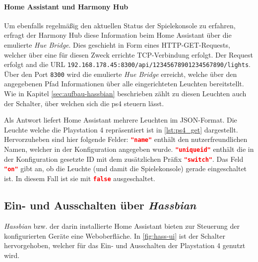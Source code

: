 






\paragraph{Home Assistant und Harmony Hub}
Um ebenfalls regelmäßig den aktuellen Status der Spielekonsole zu erfahren,
erfragt der Harmony Hub diese Information beim Home Assistant über die emulierte \textit{Hue Bridge}.
Dies geschieht in Form eines HTTP-GET-Requests,
welcher über eine für diesen Zweck errichte TCP-Verbindung erfolgt.
Der Request erfolgt and die URL \nolinkurl{192.168.178.45:8300/api/12345678901234567890/lights}.
Über den Port \texttt{8300} wird die emulierte \textit{Hue Bridge} erreicht,
welche über den angegebenen Pfad Informationen über alle eingerichteten Leuchten bereitstellt.
Wie in Kapitel \ref{sec:aufbau-hassbian} \textit{} beschrieben zählt zu diesen Leuchten
auch der Schalter, über welchen sich die \ac{ps4} steuern lässt.

Als Antwort liefert Home Assistant mehrere Leuchten im JSON-Format.
Die Leuchte welche die Playstation 4 repräsentiert ist in \autoref{lst:ps4_get} dargestellt.
Hervorzuheben sind hier folgende Felder:
\lstinline[language=json]{"name"} enthält den nutzerfreundlichen Namen,
welcher in der Konfiguration angegeben wurde.
\lstinline[language=json]{"uniqueid"} enthält die
in der Konfiguration gesetzte ID mit dem zusätzlichen Präfix \lstinline[language=json]{"switch"}.
Das Feld \lstinline[language=json]{"on"} gibt an, ob die Leuchte (und damit die Spielekonsole) gerade eingeschaltet ist.
In diesem Fall ist sie mit \lstinline[language=json]{false} ausgeschaltet.




\subsection{Ein- und Ausschalten über \textit{Hassbian}}\label{sec:durchfuehrung-hassbian}
\textit{Hassbian} bzw. der darin installierte Home Assistant bieten zur Steuerung der konfigurierten Geräte eine Weboberfläche.
In \autoref{fig:hass-ui} ist der Schalter hervorgehoben, welcher für das Ein- und Ausschalten der Playstation 4 genutzt wird.

